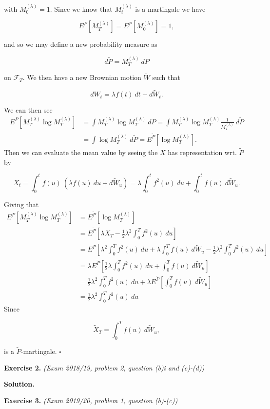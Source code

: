 \documentclass[a4paper,12pt,openany]{book}
\begin{document}
with \(M_0^{(\lambda)}=1\). Since we know that \(M_t^{(\lambda)}\) is a martingale we have

\[
E^P[M_T^{(\lambda)}]=E^P[M_0^{(\lambda)}]=1,
\]

and so we may define a new probability measure as

\[
d\tilde{P}=M_T^{(\lambda)}\ dP
\]

on \(\mathcal{F}_T\). We then have a new Brownian motion \(\tilde{W}\) such that

\[
dW_t=\lambda f(t)\ dt + d\tilde{W}_t.
\]

We can then see
\begin{align*}
E^P[M_T^{(\lambda)}\log M_T^{(\lambda)}]&=\int M_T^{(\lambda)}\log M_T^{(\lambda)}\ dP=\int M_T^{(\lambda)}\log M_T^{(\lambda)} \frac{1}{M_T^{(\lambda)}}\ d\tilde{P}\\
&=\int \log M_T^{(\lambda)}\ d\tilde{P}=E^{\tilde{P}}[\log M_T^{(\lambda)}].
\end{align*}
Then we can evaluate the mean value by seeing the \(X\) has representation wrt. \(\tilde{P}\) by

\[
X_t=\int_0^tf(u)\ (\lambda f(u)\ du + d\tilde{W}_u)=\lambda\int_0^tf^2(u)\ du+\int_0^tf(u)\ d\tilde{W}_u.
\]

Giving that
\begin{align*}
E^P[M_T^{(\lambda)}\log M_T^{(\lambda)}]&=E^{\tilde{P}}[\log M_T^{(\lambda)}]\\
&=E^{\tilde{P}}\left[ \lambda X_T-\frac{1}{2}\lambda ^2\int_0^T f^2(u)\ du \right]\\
&=E^{\tilde{P}}\left[ \lambda^2\int_0^Tf^2(u)\ du+\lambda\int_0^Tf(u)\ d\tilde{W}_u-\frac{1}{2}\lambda ^2\int_0^T f^2(u)\ du \right]\\
&=\lambda E^{\tilde{P}}\left[\frac{1}{2} \lambda\int_0^Tf^2(u)\ du+\int_0^Tf(u)\ d\tilde{W}_u \right]\\
&=\frac{1}{2} \lambda^2\int_0^Tf^2(u)\ du+\lambda E^{\tilde{P}}\left[\int_0^Tf(u)\ d\tilde{W}_u \right]\\
&=\frac{1}{2} \lambda^2\int_0^Tf^2(u)\ du
\end{align*}
Since

\[
\tilde{X}_T=\int_0^Tf(u)\ d\tilde{W}_u,
\]

is a \(\tilde{P}\)-martingale. \(\square\)

\textbf{Exercise 2.} \emph{(Exam 2018/19, problem 2, question (b)i and (c)-(d))}

\textbf{Solution.}

\textbf{Exercise 3.} \emph{(Exam 2019/20, problem 1, question (b)-(c))}
\end{document}
